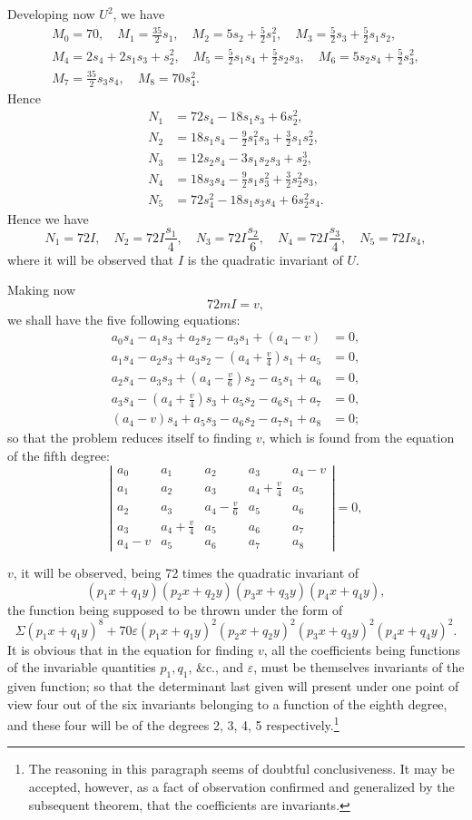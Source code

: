 \documentclass[11pt]{article}
\newcommand{\sourcepage}[1]{\marginpar{\scriptsize p.~#1}}
\begin{document}
{{\sourcepage{272}
Developing now $U^2$, we have
\[
\begin{gathered}
M_0=70,\quad M_1=\frac{35}{2}s_1,\quad
M_2=5s_2+\frac52s_1^2,\quad
M_3=\frac52s_3+\frac52s_1s_2,\\
M_4=2s_4+2s_1s_3+s_2^2,\quad
M_5=\frac52s_1s_4+\frac52s_2s_3,\quad
M_6=5s_2s_4+\frac52s_3^2,\\
M_7=\frac{35}{2}s_3s_4,\quad M_8=70s_4^2.
\end{gathered}
\]
Hence
\[
\begin{aligned}
N_1&=72s_4-18s_1s_3+6s_2^2,\\
N_2&=18s_1s_4-\frac92s_1^2s_3+\frac32s_1s_2^2,\\
N_3&=12s_2s_4-3s_1s_2s_3+s_2^3,\\
N_4&=18s_3s_4-\frac92s_1s_3^2+\frac32s_2^2s_3,\\
N_5&=72s_4^2-18s_1s_3s_4+6s_2^2s_4.
\end{aligned}
\]
Hence we have
\[
N_1=72I,\quad N_2=72I\frac{s_1}{4},\quad N_3=72I\frac{s_2}{6},\quad N_4=72I\frac{s_3}{4},\quad N_5=72Is_4,
\]
where it will be observed that $I$ is the quadratic invariant of $U$.

Making now
\[
72mI=v,
\]
we shall have the five following equations:
\[
\begin{aligned}
a_0s_4-a_1s_3+a_2s_2-a_3s_1+(a_4-v)&=0,\\
a_1s_4-a_2s_3+a_3s_2-\left(a_4+\frac{v}{4}\right)s_1+a_5&=0,\\
a_2s_4-a_3s_3+\left(a_4-\frac{v}{6}\right)s_2-a_5s_1+a_6&=0,\\
a_3s_4-\left(a_4+\frac{v}{4}\right)s_3+a_5s_2-a_6s_1+a_7&=0,\\
(a_4-v)s_4+a_5s_3-a_6s_2-a_7s_1+a_8&=0;
\end{aligned}
\]
so that the problem reduces itself to finding $v$, which is found from the equation of the fifth degree:
\[
\left|\begin{array}{ccccc}
a_0&a_1&a_2&a_3&a_4-v\\
a_1&a_2&a_3&a_4+\frac{v}{4}&a_5\\
a_2&a_3&a_4-\frac{v}{6}&a_5&a_6\\
a_3&a_4+\frac{v}{4}&a_5&a_6&a_7\\
a_4-v&a_5&a_6&a_7&a_8
\end{array}\right|=0,
\]

\sourcepage{273}
$v$, it will be observed, being 72 times the quadratic invariant of
\[
(p_1x+q_1y)(p_2x+q_2y)(p_3x+q_3y)(p_4x+q_4y),
\]
the function being supposed to be thrown under the form of
\[
\Sigma(p_1x+q_1y)^8+70\varepsilon(p_1x+q_1y)^2(p_2x+q_2y)^2(p_3x+q_3y)^2(p_4x+q_4y)^2.
\]
It is obvious that in the equation for finding $v$, all the coefficients being functions of the invariable quantities $p_1,q_1$, \&c., and $\varepsilon$, must be themselves invariants of the given function; so that the determinant last given will present under one point of view four out of the six invariants belonging to a function of the eighth degree, and these four will be of the degrees 2, 3, 4, 5 respectively.\footnote{The reasoning in this paragraph seems of doubtful conclusiveness. It may be accepted, however, as a fact of observation confirmed and generalized by the subsequent theorem, that the coefficients are invariants.}

}}
\end{document}
